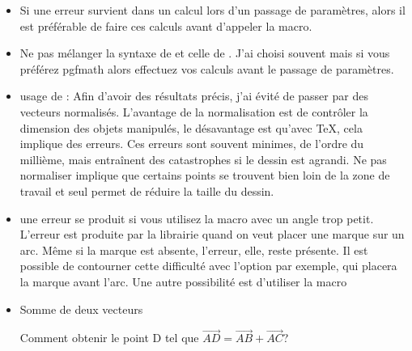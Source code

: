 \begin{itemize}
  \item Si une erreur survient dans un calcul lors d'un passage de paramètres, alors il est préférable de faire ces calculs avant d'appeler la macro.
  \item Ne pas mélanger la syntaxe de  et celle de . J'ai choisi souvent  mais si vous préférez  pgfmath alors effectuez vos calculs avant le passage de paramètres.



\item usage de  : Afin d'avoir des résultats  précis, j'ai évité de passer par des vecteurs normalisés. L'avantage de la normalisation est de contrôler la dimension des objets manipulés, le désavantage est qu'avec TeX, cela implique des erreurs. Ces erreurs sont souvent minimes, de l'ordre du millième, mais entraînent des catastrophes si le dessin est agrandi. Ne pas normaliser implique que certains points se trouvent bien loin de la zone de travail et seul  permet de réduire la taille du dessin. 


\item  une erreur se produit si vous utilisez la macro 
 avec un angle trop petit. L'erreur est produite par la librairie   quand on veut placer une marque sur un arc. Même si la marque est absente, l'erreur, elle, reste présente. Il est possible de contourner cette difficulté avec l'option  par exemple, qui placera la marque avant l'arc. Une autre possibilité est d'utiliser la macro 
\item Somme de deux vecteurs

Comment obtenir le point D tel que $\overrightarrow{AD} = \overrightarrow{AB} + \overrightarrow{AC}$?

\begin{tkzexample}[latex=5 cm,small]
\end{tkzexample}

  \end{itemize}    
\endinput